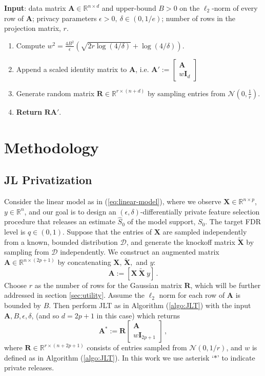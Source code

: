 \documentclass[11pt]{article}
\newcommand{\bX}{\boldsymbol{X}}
\newcommand{\bI}{\boldsymbol{I}}
\newcommand{\bXT}{\widetilde{\bX} }
\newcommand{\bA}{\boldsymbol{A}}
\newcommand{\bR}{\boldsymbol{R}}
\newcommand{\mbR}{\mathbb{R}}
\newcommand{\mcN}{\mathcal{N}}
\newcommand{\hS}{\widehat{S}}
\begin{document}
\begin{algorithm}\label{algo:JLT}
    \caption{Johnson-Lindenstrauss Transform Privatization \citep{pmlr-v70-sheffet17a}}
    \textbf{Input}: data matrix $\bA\in \mathbb{R}^{n\times d}$ and upper-bound $B>0$ on the $\ell_2$-norm of every row of $\bA$; privacy parameters $\epsilon>0,\ \delta\in(0,1/e)$; number of rows in the projection matrix, $r$.
    \begin{enumerate}[label=\arabic*.]
        \item Compute $w^2=\frac{4B^2}{\epsilon}\left(\sqrt{2r\log(4/\delta)}+\log(4/\delta)\right).$
        \item Append a scaled identity matrix to $\bA$, i.e. $\bA' := \begin{bmatrix}
            \bA \\
            w\bI_d
        \end{bmatrix}$ 
        \item Generate random matrix $\bR\in\mbR^{r\times (n+d)}$ by sampling entries from $\mcN(0,\frac{1}{r})$.
        \item \textbf{Return} $\bR\bA'$.
    \end{enumerate}
\end{algorithm}

\section{Methodology}\label{sec:method-JL}
\subsection{JL Privatization}
Consider the linear model as in (\ref{eq:linear-model}), where we observe $\bX \in \mathbb{R}^{n\times p}$, $y \in \mbR^n$, and our goal is to design an $(\epsilon, \delta)$-differentially private feature selection procedure that releases an estimate $\hS_0$ of the model support, $S_0$. The target FDR level is $q\in(0,1)$. Suppose that the entries of $\bX$ are sampled independently from a known, bounded distribution $\mathcal{D}$, and generate the knockoff matrix $\bXT$ by sampling from $\mathcal{D}$ independently. We construct an augmented matrix $\bA\in\mbR^{n\times (2p+1)}$ by concatenating $\bX$, $\bXT,$ and $y$:
\[
\bA := [\bX\ \bXT\ y]\,.
\]
Choose $r$ as the number of rows for the Gaussian matrix $\bR$, which will be further addressed in section \ref{sec:utility}. Assume the $\ell_2$ norm for each row of $\bA$ is bounded by $B$. Then perform JLT as in Algorithm (\ref{algo:JLT}) with the input $\bA,B,\epsilon,\delta$, (and so $d=2p+1$ in this case) which returns
\[
\bA^* := \bR\begin{bmatrix}
    \bA\\
    w\bI_{2p+1}
\end{bmatrix}\,, 
\]
where $\bR\in\mbR^{r\times(n+2p+1)}$ consists of entries sampled from $\mcN(0,1/r)$, and $w$ is defined as in Algorithm (\ref{algo:JLT}). In this work we use asterisk `$*$' to indicate private releases.
\end{document}
